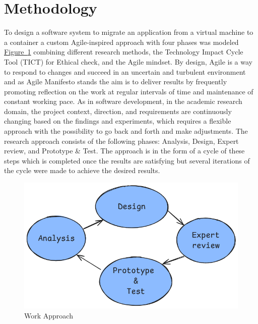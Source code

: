 \documentclass[twocolumn]{article}
\newcommand{\FigRef}[1]{\hyperref[#1]{Figure~\ref{#1}}}
\begin{document}
\section{Methodology}
To design a software system to migrate an application from a virtual machine to a container a custom Agile-inspired approach with four phases was modeled \FigRef{fig:work_approach} combining different research methods, the Technology Impact Cycle Tool (TICT) for Ethical check, and the Agile mindset. By design, Agile is a way to respond to changes and succeed in an uncertain and turbulent environment and as Agile Manifesto stands \cite{BeckEtAl-2001} the aim is to deliver results by frequently promoting reflection on the work at regular intervals of time and maintenance of constant working pace. As in software development, in the academic research domain, the project context, direction, and requirements are continuously changing based on the findings and experiments, which requires a flexible approach with the possibility to go back and forth and make adjustments. The research approach consists of the following phases: Analysis, Design, Expert review, and Prototype \& Test. The approach is in the form of a cycle of these steps which is completed once the results are satisfying but several iterations of the cycle were made to achieve the desired results.

\begin{figure}[H]
    \centering
    \includegraphics[width=\linewidth]{images/approach.png}
    \caption{Work Approach}
    \label{fig:work_approach}
\end{figure}
\end{document}
